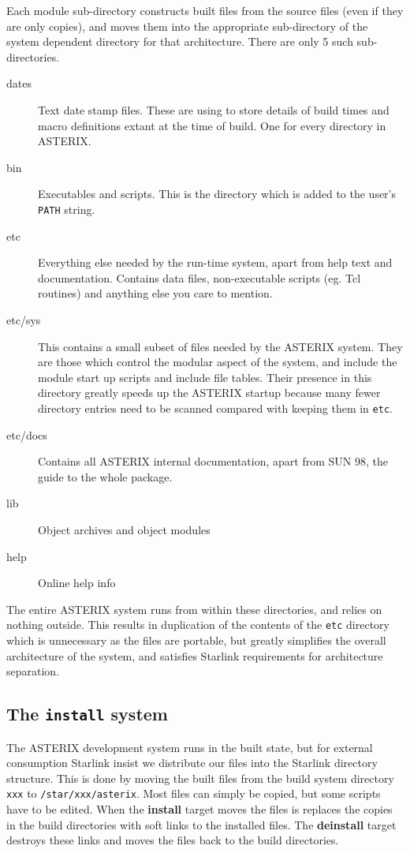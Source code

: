 Each module sub-directory constructs built files from the source files (even
if they are only copies), and moves them into the appropriate sub-directory
of the system dependent directory for that architecture. There are only 5 
such sub-directories.
\begin{description}
\item[dates] Text date stamp files. These are using to store details
  of build times and macro definitions extant at the time of build. One
  for every directory in ASTERIX.
\item[bin] Executables and scripts. This is the directory which is
  added to the user's \verb+PATH+ string.
\item[etc] Everything else needed by the run-time system, apart from
  help text and documentation. Contains data files, non-executable
  scripts (eg. Tcl routines) and anything else you care to mention.
\item[etc/sys] This contains a small subset of files needed by the ASTERIX
  system. They are those which control the modular aspect of the system,
  and include the module start up scripts and include file tables. Their
  presence in this directory greatly speeds up the ASTERIX startup because
  many fewer directory entries need to be scanned compared with keeping
  them in {\tt etc}.
\item[etc/docs] Contains all ASTERIX internal documentation, apart from 
  SUN 98, the guide to the whole package.
\item[lib] Object archives and object modules
\item[help] Online help info
\end{description}
The entire ASTERIX system runs from within these directories, and relies
on nothing outside. This results in duplication of the contents of the 
\verb+etc+ directory which is unnecessary as the files are portable, but
greatly simplifies the overall architecture of the system, and satisfies
Starlink requirements for architecture separation.

\subsection{The {\tt install} system}

The ASTERIX development system runs in the built state, but for 
external consumption Starlink insist we distribute our files into
the Starlink directory structure. This is done by moving the built
files from the build system directory \verb+xxx+ to \verb+/star/xxx/asterix+.
Most files can simply be copied, but some scripts have to be edited.
When the {\bf install} target moves the files is replaces the copies
in the build directories with soft links to the installed files. The
{\bf deinstall} target destroys these links and moves the files back
to the build directories.


